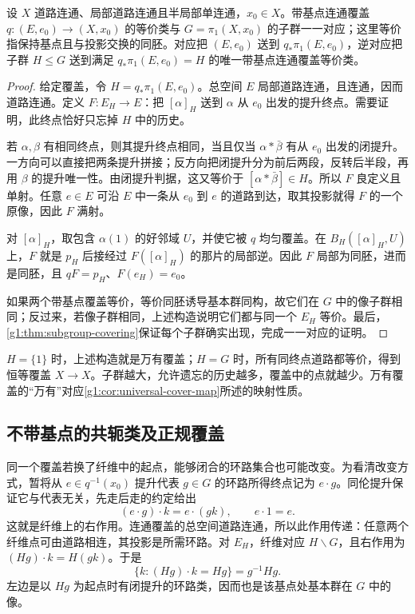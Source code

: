 \begin{theorem}\label{g1:thm:based-covering-classification}
	设 \(X\) 道路连通、局部道路连通且半局部单连通，\(x_0\in X\)。带基点连通覆盖 \(q:(E,e_0)\to(X,x_0)\) 的等价类与 \(G=\pi_1(X,x_0)\) 的子群一一对应；这里等价指保持基点且与投影交换的同胚。对应把 \((E,e_0)\) 送到 \(q_*\pi_1(E,e_0)\)，逆对应把子群 \(H\le G\) 送到满足 \(q_*\pi_1(E,e_0)=H\) 的唯一带基点连通覆盖等价类。
\end{theorem}
\begin{proof}
	给定覆盖，令 \(H=q_*\pi_1(E,e_0)\)。总空间 \(E\) 局部道路连通，且连通，因而道路连通。定义 \(F:E_H\to E\)：把 \([\alpha]_H\) 送到 \(\alpha\) 从 \(e_0\) 出发的提升终点。需要证明，此终点恰好只忘掉 \(H\) 中的历史。

	若 \(\alpha,\beta\) 有相同终点，则其提升终点相同，当且仅当 \(\alpha*\bar\beta\) 有从 \(e_0\) 出发的闭提升。一方向可以直接把两条提升拼接；反方向把闭提升分为前后两段，反转后半段，再用 \(\beta\) 的提升唯一性。由闭提升判据，这又等价于 \([\alpha*\bar\beta]\in H\)。所以 \(F\) 良定义且单射。任意 \(e\in E\) 可沿 \(E\) 中一条从 \(e_0\) 到 \(e\) 的道路到达，取其投影就得 \(F\) 的一个原像，因此 \(F\) 满射。

	对 \([\alpha]_H\)，取包含 \(\alpha(1)\) 的好邻域 \(U\)，并使它被 \(q\) 均匀覆盖。在 \(B_H([\alpha]_H,U)\) 上，\(F\) 就是 \(p_H\) 后接经过 \(F([\alpha]_H)\) 的那片的局部逆。因此 \(F\) 局部为同胚，进而是同胚，且 \(qF=p_H\)、\(F(e_H)=e_0\)。

	如果两个带基点覆盖等价，等价同胚诱导基本群同构，故它们在 \(G\) 中的像子群相同；反过来，若像子群相同，上述构造说明它们都与同一个 \(E_H\) 等价。最后，\cref{g1:thm:subgroup-covering}保证每个子群确实出现，完成一一对应的证明。
\end{proof}

\(H=\{1\}\) 时，上述构造就是万有覆盖；\(H=G\) 时，所有同终点道路都等价，得到恒等覆盖 \(X\to X\)。子群越大，允许遗忘的历史越多，覆盖中的点就越少。万有覆盖的“万有”对应\cref{g1:cor:universal-cover-map}所述的映射性质。

\subsection{不带基点的共轭类及正规覆盖}
\label{g1:subsec:0504:04}

同一个覆盖若换了纤维中的起点，能够闭合的环路集合也可能改变。为看清改变方式，暂将从 \(e\in q^{-1}(x_0)\) 提升代表 \(g\in G\) 的环路所得终点记为 \(e\cdot g\)。同伦提升保证它与代表无关，先走后走的约定给出
\[
	(e\cdot g)\cdot k=e\cdot(gk),\qquad e\cdot1=e.
\]
这就是纤维上的右作用。连通覆盖的总空间道路连通，所以此作用传递：任意两个纤维点可由道路相连，其投影是所需环路。对 \(E_H\)，纤维对应 \(H\backslash G\)，且右作用为 \((Hg)\cdot k=H(gk)\)。于是
\[
	\{k:(Hg)\cdot k=Hg\}=g^{-1}Hg.
\]
左边是以 \(Hg\) 为起点时有闭提升的环路类，因而也是该基点处基本群在 \(G\) 中的像。

